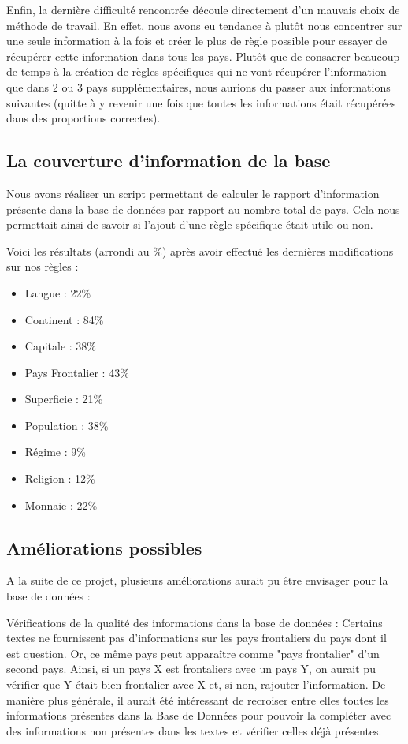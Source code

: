 \documentclass[11pt,a4paper]{article}
\begin{document}
Enfin, la dernière difficulté rencontrée découle directement d'un mauvais choix de méthode de travail.
En effet, nous avons eu tendance à plutôt nous concentrer sur une seule information à la fois et créer le plus de règle possible pour essayer de récupérer cette information dans tous les pays.
Plutôt que de consacrer beaucoup de temps à la création de règles spécifiques qui ne vont récupérer l'information que dans 2 ou 3 pays supplémentaires, nous aurions du passer aux informations suivantes (quitte à y revenir une fois que toutes les informations était récupérées dans des proportions correctes).

\subsection{La couverture d'information de la base}
Nous avons réaliser un script permettant de calculer le rapport d'information présente dans la base de données par rapport au nombre total de pays.
Cela nous permettait ainsi de savoir si l'ajout d'une règle spécifique était utile ou non.

Voici les résultats (arrondi au \%) après avoir effectué les dernières modifications sur nos règles :
\begin{itemize}
	\item Langue 		  : 22\%
	\item Continent 	  : 84\%
	\item Capitale 		  : 38\%
	\item Pays Frontalier : 43\%
	\item Superficie	  : 21\%
	\item Population 	  : 38\%
	\item Régime 		  : 9\%
	\item Religion		  : 12\%
	\item Monnaie		  : 22\%
\end{itemize}

  


\subsection{Améliorations possibles}
A la suite de ce projet, plusieurs améliorations aurait pu être envisager pour la base de données :

Vérifications de la qualité des informations dans la base de données : 	
Certains textes ne fournissent pas d'informations sur les pays frontaliers du pays dont il est question.
Or, ce même pays peut apparaître comme "pays frontalier" d'un second pays.
Ainsi, si un pays X est frontaliers avec un pays Y, on aurait pu vérifier que Y était bien frontalier avec X et, si non, rajouter l'information.
De manière plus générale, il aurait été intéressant de recroiser entre elles toutes les informations présentes dans la Base de Données pour pouvoir la compléter avec des informations non présentes dans les textes et vérifier celles déjà présentes.
	
\end{document}
